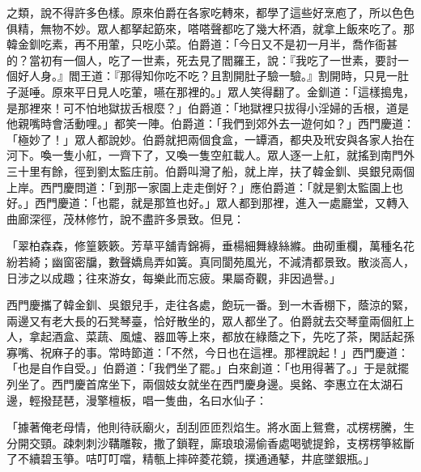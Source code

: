 之類，說不得許多色樣。原來伯爵在各家吃轉來，都學了這些好烹庖了，所以色色俱精，無物不妙。眾人都拏起筯來，嗒嗒聲都吃了幾大杯酒，就拿上飯來吃了。那韓金釧吃素，再不用葷，只吃小菜。伯爵道：「今日又不是初一月半，喬作衙甚的？當初有一個人，吃了一世素，死去見了閻羅王，說：『我吃了一世素，要討一個好人身。』閻王道：『那得知你吃不吃？且割開肚子驗一驗。』割開時，只見一肚子涎唾。原來平日見人吃葷，嚥在那裡的。」眾人笑得翻了。金釧道：「這樣搗鬼，是那裡來！可不怕地獄拔舌根麼？」伯爵道：「地獄裡只拔得小淫婦的舌根，道是他親嘴時會活動哩。」都笑一陣。伯爵道：「我們到郊外去一遊何如？」西門慶道：「極妙了！」眾人都說妙。伯爵就把兩個食盒，一罈酒，都央及玳安與各家人抬在河下。喚一隻小舡，一齊下了，又喚一隻空舡載人。眾人逐一上舡，就搖到南門外三十里有餘，徑到劉太監庄前。伯爵叫灣了船，就上岸，扶了韓金釧、吳銀兒兩個上岸。西門慶問道：「到那一家園上走走倒好？」應伯爵道：「就是劉太監園上也好。」西門慶道：「也罷，就是那笪也好。」眾人都到那裡，進入一處廳堂，又轉入曲廊深徑，茂林修竹，說不盡許多景致。但見：

「翠柏森森，修篁簌簌。芳草平舖青錦褥，垂楊細舞綠絲縧。曲砌重欄，萬種名花紛若綺；幽窗密牖，數聲嬌鳥弄如簧。真同閬苑風光，不減清都景致。散淡高人，日涉之以成趣；往來游女，每樂此而忘疲。果屬奇觀，非因過譽。」

西門慶攜了韓金釧、吳銀兒手，走往各處，飽玩一番。到一木香棚下，蔭涼的緊，兩邊又有老大長的石凳琴臺，恰好散坐的，眾人都坐了。伯爵就去交琴童兩個舡上人，拿起酒盒、菜蔬、風爐、器皿等上來，都放在綠蔭之下，先吃了茶，閑話起孫寡嘴、祝麻子的事。常時節道：「不然，今日也在這裡。那裡說起！」西門慶道：「也是自作自受。」伯爵道：「我們坐了罷。」白來創道：「也用得著了。」于是就擺列坐了。西門慶首席坐下，兩個妓女就坐在西門慶身邊。吳銘、李惠立在太湖石邊，輕撥琵琶，漫擎檀板，唱一隻曲，名曰水仙子：

「據著俺老母情，他則待祅廟火，刮刮匝匝烈焰生。將水面上鴛鴦，忒楞楞騰，生分開交頸。疎刺刺沙鞲雕鞍，撒了鎖鞓，廝琅琅湯偷香處喝號提鈴，支楞楞箏絃斷了不續碧玉箏。咭叮叮噹，精甎上摔碎菱花鏡，撲通通鼕，井底墜銀瓶。」


